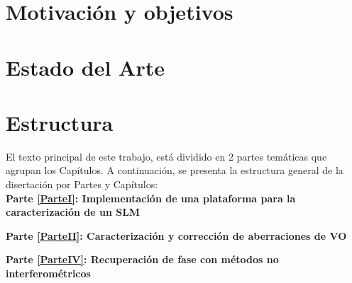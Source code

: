 \section{Motivación y objetivos\label{sec:motiv}}


\section{Estado del Arte\label{sec:estadoArte}}




\section{Estructura\label{sec:estructura}}

El texto principal de este trabajo, está dividido en 2 partes temáticas que agrupan los Capítulos. A continuación, se presenta la estructura general de la disertación por Partes y Capítulos: \\


\textbf{Parte \ref{ParteI}: Implementación de una plataforma para la caracterización de un SLM}



\textbf{Parte \ref{ParteII}: Caracterización y corrección de aberraciones de VO}


\textbf{Parte \ref{ParteIV}: Recuperación de fase con métodos no interferométricos}


\newpage
\pagebreak[4]






